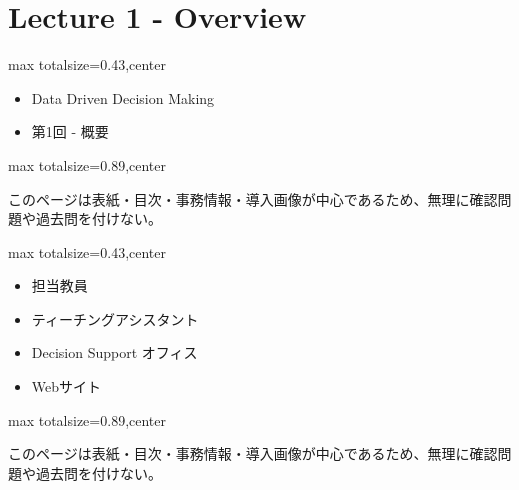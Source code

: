 \section*{Lecture 1 - Overview}

\clearpage
{}
\begin{minipage}[t]{0.405\textwidth}
\begin{adjustbox}{max totalsize={\textwidth}{0.43\textheight},center}
\begin{minipage}{\textwidth}\scriptsize
{}\begin{itemize}
\item Data Driven Decision Making
\item 第1回 - 概要
\end{itemize}
\end{minipage}
\end{adjustbox}
\end{minipage}\hfill
\begin{minipage}[t]{0.58\textwidth}
\begin{adjustbox}{max totalsize={\textwidth}{0.89\textheight},center}
\begin{minipage}{\textwidth}\scriptsize
{}このページは表紙・目次・事務情報・導入画像が中心であるため、無理に確認問題や過去問を付けない。
\end{minipage}
\end{adjustbox}
\end{minipage}


\clearpage
{}
\begin{minipage}[t]{0.405\textwidth}
\begin{adjustbox}{max totalsize={\textwidth}{0.43\textheight},center}
\begin{minipage}{\textwidth}\scriptsize
{}\begin{itemize}
\item 担当教員
\item ティーチングアシスタント
\item Decision Support オフィス
\item Webサイト
\end{itemize}
\end{minipage}
\end{adjustbox}
\end{minipage}\hfill
\begin{minipage}[t]{0.58\textwidth}
\begin{adjustbox}{max totalsize={\textwidth}{0.89\textheight},center}
\begin{minipage}{\textwidth}\scriptsize
{}このページは表紙・目次・事務情報・導入画像が中心であるため、無理に確認問題や過去問を付けない。
\end{minipage}
\end{adjustbox}
\end{minipage}


